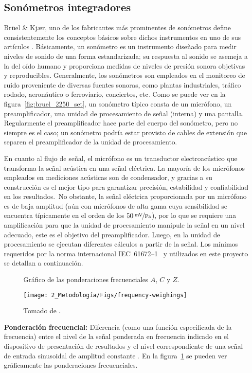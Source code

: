\subsection{Sonómetros integradores}
Brüel \& Kjær, uno de los fabricantes más prominentes de sonómetros define consistentemente los conceptos básicos sobre dichos instrumentos en uno de sus artículos .
Básicamente, un sonómetro es un instrumento diseñado para medir niveles de sonido de una forma estandarizada;
su respuesta al sonido se asemeja a la del oído humano y proporciona medidas de niveles de presión sonora objetivas y reproducibles.
Generalmente, los sonómetros son empleados en el monitoreo de ruido proveniente de diversas fuentes sonoras, como plantas industriales, tráfico rodado, aeronáutico o ferroviario, conciertos, etc.
Como se puede ver en la figura~\ref{fig:bruel_2250_set}, un sonómetro típico consta de un micrófono, un preamplificador, una unidad de procesamiento de señal (interna) y una pantalla.
Regularmente el preamplificador hace parte del cuerpo del sonómetro, pero no siempre es el caso;
un sonómetro podría estar provisto de cables de extensión que separen el preamplificador de la unidad de procesamiento.

En cuanto al flujo de señal, el micrófono es un transductor electroacústico que transforma la señal acústica en una señal eléctrica.
La mayoría de los micrófonos empleados en mediciones acústicas son de condensador, y gracias a su construcción es el mejor tipo para garantizar precisión, estabilidad y confiabilidad en los resultados.\ No obstante, la señal eléctrica proporcionada por un micrófono es de baja amplitud (aún con micrófonos de alta gama cuya sensibilidad se encuentra típicamente en el orden de los $50\,\nicefrac{\unit{\mV}}{\unit{\Pa}}$), por lo que se requiere una amplificación para que la unidad de procesamiento manipule la señal en un nivel adecuado, este es el objetivo del preamplificador.
Luego, en la unidad de procesamiento se ejecutan diferentes cálculos a partir de la señal.
Los mínimos requeridos por la norma internacional \mbox{IEC 61672--1}~\citeyearpar{IEC_TC29_2013_1} y utilizados en este proyecto se detallan a continuación.

\begin{figure}[!h]
    \caption{Gráfico de las ponderaciones frecuenciales $A$, $C$ y $Z$.}
    \label{fig:frequency_weightings}
    \centering
    \texttt{[image: 2\_Metodología/Figs/frequency-weighings]}
    \caption*{\footnotesize Tomado de .}
\end{figure}
%
\textbf{Ponderación frecuencial:} Diferencia (como una función especificada de la frecuencia) entre el nivel de la señal ponderada en frecuencia indicado en el dispositivo de presentación de resultados y el nivel correspondiente de una señal de entrada sinusoidal de amplitud constante .
En la figura~\ref{fig:frequency_weightings} se pueden ver gráficamente las ponderaciones frecuenciales.

